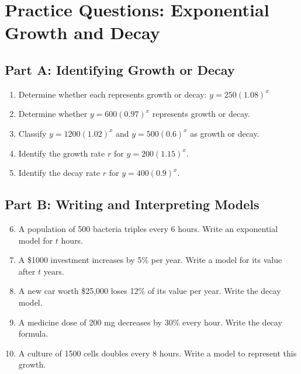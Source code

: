 \documentclass[14pt]{extarticle}
\begin{document}
\newpage


\section*{Practice Questions: Exponential Growth and Decay}

\subsection*{Part A: Identifying Growth or Decay}
\begin{enumerate}
  \item Determine whether each represents growth or decay:  
  \(y = 250(1.08)^x\)
  \item Determine whether \(y = 600(0.97)^x\) represents growth or decay.
  \item Classify \(y = 1200(1.02)^x\) and \(y = 500(0.6)^x\) as growth or decay.
  \item Identify the growth rate \(r\) for \(y = 200(1.15)^x.\)
  \item Identify the decay rate \(r\) for \(y = 400(0.9)^x.\)
\end{enumerate}

\subsection*{Part B: Writing and Interpreting Models}
\begin{enumerate}
  \setcounter{enumi}{5}
  \item A population of 500 bacteria triples every 6 hours. Write an exponential model for \(t\) hours.
  \item A \$1000 investment increases by 5\% per year. Write a model for its value after \(t\) years.
  \item A new car worth \$25,000 loses 12\% of its value per year. Write the decay model.
  \item A medicine dose of 200 mg decreases by 30\% every hour. Write the decay formula.
  \item A culture of 1500 cells doubles every 8 hours. Write a model to represent this growth.
\end{enumerate}
\end{document}
